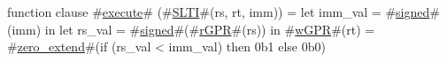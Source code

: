 function clause #\hyperref[zexecute]{execute}# (#\hyperref[zSLTI]{SLTI}#(rs, rt, imm)) =
  {
    let imm_val = #\hyperref[zsigned]{signed}#(imm) in
    let rs_val = #\hyperref[zsigned]{signed}#(#\hyperref[zrGPR]{rGPR}#(rs)) in
    #\hyperref[zwGPR]{wGPR}#(rt) = #\hyperref[zzzerozyextend]{zero\_extend}#(if (rs_val < imm_val) then 0b1 else 0b0)
  }
